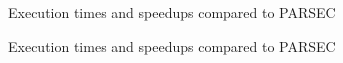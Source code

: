 {\begin{figure}
{    }
    \caption{Execution times and speedups compared to PARSEC \cite{PARSEC_VD}}
\end{figure}
\begin{figure}\ContinuedFloat
    \centering
    \setcounter{subfigure}{4}
    \caption{Execution times and speedups compared to PARSEC \cite{PARSEC_VD}}
\end{figure}

}
